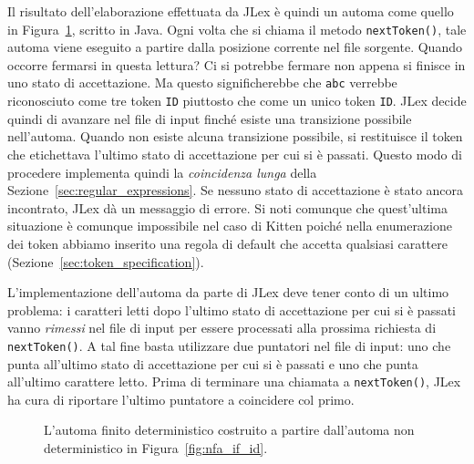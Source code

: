 Il risultato dell'elaborazione effettuata da JLex \`e quindi
un automa come quello in Figura~\ref{fig:dfa_if_id}, scritto in Java.
Ogni volta che si chiama il metodo \texttt{nextToken()}, tale automa viene
eseguito a partire dalla posizione corrente nel file sorgente. Quando occorre
fermarsi in questa lettura? Ci si potrebbe fermare non appena si finisce in uno
stato di accettazione. Ma questo significherebbe che \texttt{abc} verrebbe
riconosciuto come tre token \texttt{ID} piuttosto che come un unico token
\texttt{ID}. JLex decide quindi di avanzare nel file di input
finch\'e esiste una transizione possibile nell'automa. Quando non esiste
\piu alcuna transizione possibile, si restituisce il token che etichettava
l'ultimo stato di accettazione per cui si \`e passati.
Questo modo di procedere implementa quindi la \emph{coincidenza \piu
lunga} della Sezione~\ref{sec:regular_expressions}. Se nessuno stato di
accettazione \`e stato ancora incontrato, JLex
d\`a un messaggio di errore. Si noti comunque che quest'ultima situazione
\`e comunque impossibile nel caso di Kitten poich\'e nella enumerazione dei
token abbiamo inserito una regola di default che accetta qualsiasi carattere
(Sezione~\ref{sec:token_specification}).

L'implementazione dell'automa da parte di JLex deve tener conto di
un ultimo problema: i caratteri letti dopo l'ultimo stato di accettazione
per cui si \`e passati vanno \emph{rimessi} nel file di input per essere
processati alla prossima richiesta di \texttt{nextToken()}. A tal fine
basta utilizzare due puntatori nel file di input: uno che punta all'ultimo
stato di accettazione per cui si \`e passati e uno che punta all'ultimo
carattere letto. Prima di terminare una chiamata a \texttt{nextToken()},
JLex ha cura di riportare l'ultimo puntatore a coincidere col primo.
%
\begin{figure}[t]
\begin{center}
\end{center}
\caption{L'automa finito deterministico costruito a partire dall'automa non deterministico in Figura~\ref{fig:nfa_if_id}.}\label{fig:dfa_if_id}
\end{figure}
%
